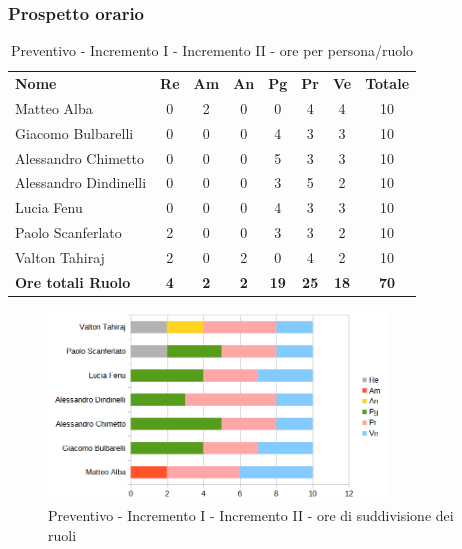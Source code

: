 \subsubsection{Prospetto orario}

	\begin{table} [h!]
	\begin{center}
		\begin{tabular} { m{3.5cm} c c c c c c c }
			\rowcolor{lightgray}
			\textbf{Nome} & \textbf{Re} & \textbf{Am} & \textbf{An} & \textbf{Pg} & \textbf{Pr} & \textbf{Ve} & \textbf{Totale} \\
			Matteo Alba & 0&2 & 0& 0&4 & 4 & 10 \\
			Giacomo Bulbarelli & 0& 0& 0& 4 & 3 & 3 & 10 \\
			Alessandro Chimetto & 0& 0& 0& 5 & 3 & 3 & 10 \\
			Alessandro Dindinelli & 0& 0& 0& 3 & 5 &2 & 10 \\
			Lucia Fenu & 0& 0& 0& 4 & 3 & 3 & 10 \\
			Paolo Scanferlato &2 & 0& 0& 3 & 3 & 2 & 10 \\
			Valton Tahiraj & 2& 0&2 & 0& 4 & 2 & 10 \\
			\textbf{Ore totali Ruolo} & \textbf{4} & \textbf{2} & \textbf{2} & \textbf{19} & \textbf{25}& \textbf{18} & \textbf{70}
		\end{tabular}
		\caption{Preventivo - Incremento I - Incremento II - ore per persona/ruolo}
	\end{center}
\end{table}
	\begin{figure} [h!]
	\centering
	\includegraphics[width=0.8\textwidth]{res/img/preventivi/1e2-barre.png}
	\caption{Preventivo - Incremento I - Incremento II - ore di suddivisione dei ruoli} 
\end{figure}

\newpage

